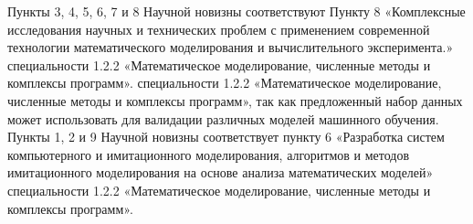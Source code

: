 {\appropriation}
Пункты 3, 4, 5, 6, 7 и 8 Научной новизны соответствуют Пункту 8 «Комплексные исследования научных и технических проблем с применением современной технологии математического моделирования и
вычислительного эксперимента.» специальности 1.2.2 «Математическое моделирование, численные методы и комплексы программ». специальности 1.2.2 «Математическое моделирование, численные методы и комплексы программ», так как предложенный набор данных может использовать для валидации различных моделей машинного обучения. Пункты 1, 2 и 9 Научной новизны соответствует пункту 6 «Разработка систем компьютерного и имитационного моделирования, алгоритмов и методов имитационного моделирования на основе анализа математических моделей» специальности 1.2.2 «Математическое моделирование, численные методы и комплексы программ».

